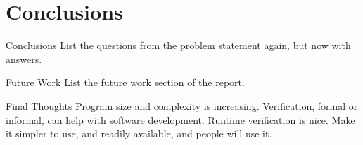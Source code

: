 \documentclass{beamer}
\begin{document}
\section{Conclusions}
\begin{frame}{Conclusions}
  List the questions from the problem statement again, but now with answers.
\end{frame}

\begin{frame}{Future Work}
  List the future work section of the report.
\end{frame}

\begin{frame}{Final Thoughts}
  Program size and complexity is increasing. Verification, formal or informal,
  can help with software development. Runtime verification is nice. Make it
  simpler to use, and readily available, and people will use it.
\end{frame}
\end{document}
